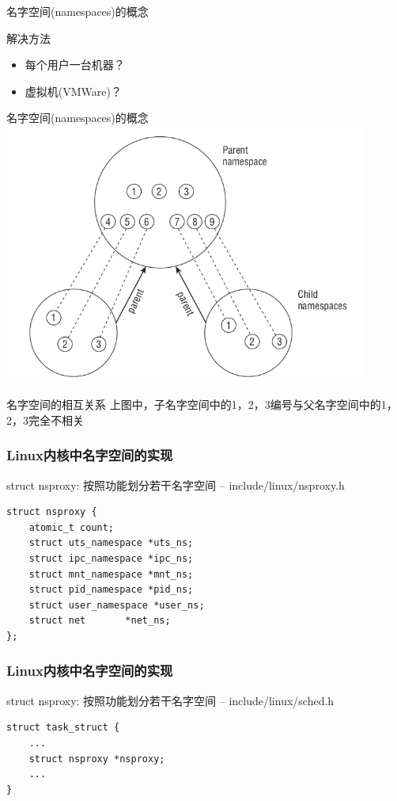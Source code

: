\documentclass[xcolor=svgnames]{beamer}
\begin{document}
\begin{CJK*}{UTF8}{gbsn}
\begin{frame}{名字空间(namespaces)的概念}
\begin{block}{解决方法}
\begin{itemize}
\item 每个用户一台机器？
\item 虚拟机(VMWare)？
\end{itemize}
\end{block}

\end{frame}

\begin{frame}{名字空间(namespaces)的概念}
\includegraphics[width=0.9\textwidth]{ns.png}
\begin{block}{名字空间的相互关系}
上图中，子名字空间中的1，2，3编号与父名字空间中的1，2，3完全不相关
\end{block}
\end{frame}

\begin{frame}[fragile]
\frametitle{Linux内核中名字空间的实现}
\begin{block}{struct nsproxy: 按照功能划分若干名字空间 -- include/linux/nsproxy.h}
\begin{verbatim}
struct nsproxy {
    atomic_t count;
    struct uts_namespace *uts_ns;
    struct ipc_namespace *ipc_ns;
    struct mnt_namespace *mnt_ns;
    struct pid_namespace *pid_ns;
    struct user_namespace *user_ns;
    struct net       *net_ns;
};
\end{verbatim}
\end{block}
\end{frame}

\begin{frame}[fragile]
\frametitle{Linux内核中名字空间的实现}
\begin{block}{struct nsproxy: 按照功能划分若干名字空间 -- include/linux/sched.h}
\begin{verbatim}
struct task_struct {
    ...
    struct nsproxy *nsproxy;
    ...
}
\end{verbatim}
\end{block}
\end{frame}


\end{CJK*}
\end{document}
